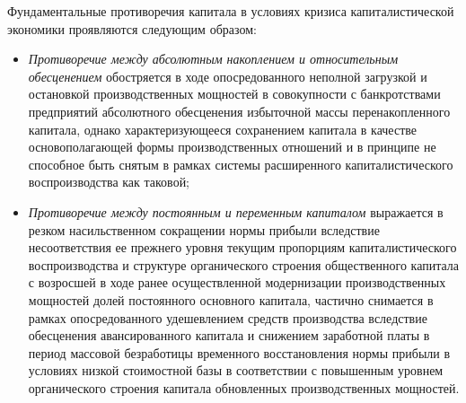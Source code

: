 Фундаментальные противоречия капитала в условиях кризиса капиталистической экономики проявляются следующим образом:
\begin{itemize}
    \item \textit{Противоречие между абсолютным накоплением и относительным обесценением} обостряется в ходе опосредованного неполной загрузкой и остановкой производственных мощностей в совокупности с банкротствами предприятий абсолютного обесценения избыточной массы перенакопленного капитала, однако характеризующееся сохранением капитала в качестве основополагающей формы производственных отношений и в принципе не способное быть снятым в рамках системы расширенного капиталистического воспроизводства как таковой;
    \item \textit{Противоречие между постоянным и переменным капиталом} выражается в резком насильственном сокращении нормы прибыли вследствие несоответствия ее прежнего уровня текущим пропорциям капиталистического воспроизводства и структуре органического строения общественного капитала с возросшей в ходе ранее осуществленной модернизации производственных мощностей долей постоянного основного капитала, частично снимается в рамках опосредованного удешевлением средств производства вследствие обесценения авансированного капитала и снижением заработной платы в период массовой безработицы временного восстановления нормы прибыли в условиях низкой стоимостной базы в соответствии с повышенным уровнем органического строения капитала обновленных производственных мощностей.
\end{itemize}

